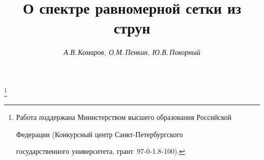 

 




 


\newcommand{\const}{\operatorname{const}} 


\newcommand{\tts}[1]{} 


 




 


\setcounter{page}{23} 












 


\author{\it А.В.\,Комаров, О.М.\,Пенкин, Ю.В.\,Покорный} 




\title{О спектре равномерной сетки из струн} 


\thanks{Работа поддержана Министерством высшего образования Российской 


Федерации (Конкурсный центр Санкт-Петербургского 


государственного университета, грант \No\,97-0-1.8-100).} 


 


\date{} 




\pagestyle{plain} %


 




